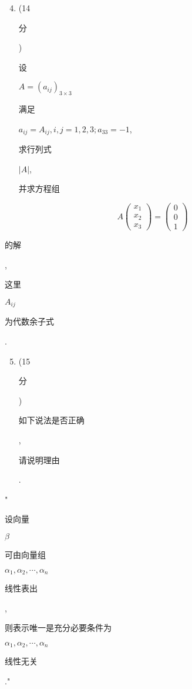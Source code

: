 \documentclass[10pt]{article}
\begin{document}
\begin{enumerate}
  \setcounter{enumi}{3}
  \item (14 \begin{CJK}{UTF8}{mj}分\end{CJK}) \begin{CJK}{UTF8}{mj}设\end{CJK} $A=\left(a_{i j}\right)_{3 \times 3}$ \begin{CJK}{UTF8}{mj}满足\end{CJK} $a_{i j}=A_{i j}, i, j=1,2,3 ; a_{33}=-1$, \begin{CJK}{UTF8}{mj}求行列式\end{CJK} $|A|$, \begin{CJK}{UTF8}{mj}并求方程组\end{CJK}
\end{enumerate}
$$
A\left(\begin{array}{l}
x_{1} \\
x_{2} \\
x_{3}
\end{array}\right)=\left(\begin{array}{l}
0 \\
0 \\
1
\end{array}\right)
$$
\begin{CJK}{UTF8}{mj}的解\end{CJK}, \begin{CJK}{UTF8}{mj}这里\end{CJK} $A_{i j}$ \begin{CJK}{UTF8}{mj}为代数余子式\end{CJK}.

\begin{enumerate}
  \setcounter{enumi}{4}
  \item (15 \begin{CJK}{UTF8}{mj}分\end{CJK}) \begin{CJK}{UTF8}{mj}如下说法是否正确\end{CJK}, \begin{CJK}{UTF8}{mj}请说明理由\end{CJK}.
\end{enumerate}
"\begin{CJK}{UTF8}{mj}设向量\end{CJK} $\beta$ \begin{CJK}{UTF8}{mj}可由向量组\end{CJK} $\alpha_{1}, \alpha_{2}, \cdots, \alpha_{n}$ \begin{CJK}{UTF8}{mj}线性表出\end{CJK}, \begin{CJK}{UTF8}{mj}则表示唯一是充分必要条件为\end{CJK} $\alpha_{1}, \alpha_{2}, \cdots, \alpha_{n}$ \begin{CJK}{UTF8}{mj}线性无关\end{CJK}."
\end{document}
